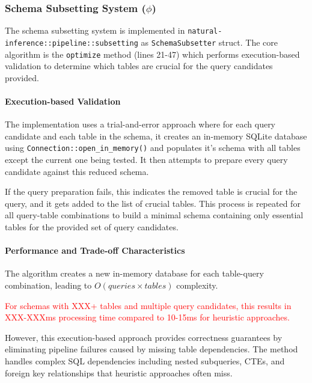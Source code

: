 \subsubsection{Schema Subsetting System ($\phi$)}


The schema subsetting system is implemented in
\texttt{natural-inference::pipeline::subsetting} as
\texttt{SchemaSubsetter} struct. The core algorithm is the \texttt{optimize}
method (lines 21-47) which performs execution-based validation to determine
which tables are crucial for the query candidates provided.

\paragraph{Execution-based Validation}

The implementation uses a trial-and-error approach where for each query
candidate and each table in the schema, it creates an in-memory SQLite database
using \texttt{Connection::open\_in\_memory()} and populates it's schema with all
tables except the current one being tested. It then attempts to prepare every
query candidate against this reduced schema.

If the query preparation fails, this indicates the removed table is crucial
for the query, and it gets added to the list of crucial tables.
This process is repeated for all query-table combinations to build a minimal
schema containing only essential tables for the provided set of query candidates.

\paragraph{Performance and Trade-off Characteristics}

The algorithm creates a new in-memory database for each table-query
combination, leading to $O(queries \times tables)$ complexity. 

\textcolor{red}{For schemas with XXX+ tables and multiple query candidates, this results in XXX-XXXms processing time
compared to 10-15ms for heuristic approaches.}

However, this execution-based approach provides correctness guarantees by
eliminating pipeline failures caused by missing table dependencies. The
method handles complex SQL dependencies including nested subqueries, CTEs,
and foreign key relationships that heuristic approaches often miss.

